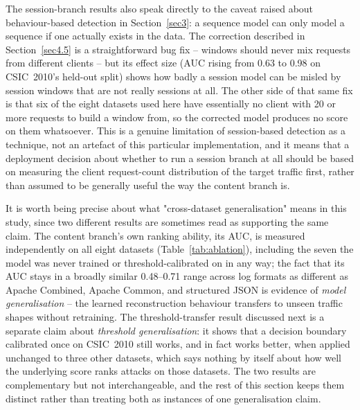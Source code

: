 \documentclass[futureinternet,article,submit,moreauthors]{Definitions/mdpi}
\begin{document}
The session-branch results also speak directly to the caveat raised about behaviour-based detection in Section~\ref{sec3}: a sequence model can only model a sequence if one actually exists in the data. The correction described in Section~\ref{sec4.5} is a straightforward bug fix -- windows should never mix requests from different clients -- but its effect size (AUC rising from 0.63 to 0.98 on CSIC~2010's held-out split) shows how badly a session model can be misled by session windows that are not really sessions at all. The other side of that same fix is that six of the eight datasets used here have essentially no client with 20 or more requests to build a window from, so the corrected model produces no score on them whatsoever. This is a genuine limitation of session-based detection as a technique, not an artefact of this particular implementation, and it means that a deployment decision about whether to run a session branch at all should be based on measuring the client request-count distribution of the target traffic first, rather than assumed to be generally useful the way the content branch is.

It is worth being precise about what "cross-dataset generalisation" means in this study, since two different results are sometimes read as supporting the same claim. The content branch's own ranking ability, its AUC, is measured independently on all eight datasets (Table~\ref{tab:ablation}), including the seven the model was never trained or threshold-calibrated on in any way; the fact that its AUC stays in a broadly similar 0.48--0.71 range across log formats as different as Apache Combined, Apache Common, and structured JSON is evidence of \emph{model generalisation} -- the learned reconstruction behaviour transfers to unseen traffic shapes without retraining. The threshold-transfer result discussed next is a separate claim about \emph{threshold generalisation}: it shows that a decision boundary calibrated once on CSIC~2010 still works, and in fact works better, when applied unchanged to three other datasets, which says nothing by itself about how well the underlying score ranks attacks on those datasets. The two results are complementary but not interchangeable, and the rest of this section keeps them distinct rather than treating both as instances of one generalisation claim.
\end{document}
